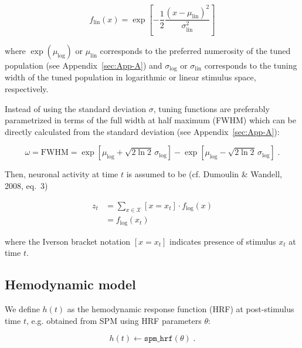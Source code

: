 \documentclass[a4paper,12pt]{article}
\begin{document}
\begin{equation} \label{eq:f-lin}
f_\mathrm{lin}(x) = \exp \left[ -\frac{1}{2} \frac{(x - \mu_\mathrm{lin})^2}{\sigma_\mathrm{lin}^2} \right]
\end{equation}

where $\exp(\mu_\mathrm{log})$ or $\mu_\mathrm{lin}$ corresponds to the preferred numerosity of the tuned population (see Appendix~\ref{sec:App-A}) and $\sigma_\mathrm{log}$ or $\sigma_\mathrm{lin}$ corresponds to the tuning width of the tuned population in logarithmic or linear stimulus space, respectively.

Instead of using the standard deviation $\sigma$, tuning functions are preferably parametrized in terms of the full width at half maximum (FWHM) which can be directly calculated from the standard deviation (see Appendix~\ref{sec:App-A}):

\begin{equation} \label{eq:fwhm-sigma}
\omega = \mathrm{FWHM} = \exp \left[ \mu_\mathrm{log} + \sqrt{2 \ln 2} \, \sigma_\mathrm{log} \right] - \exp \left[ \mu_\mathrm{log} - \sqrt{2 \ln 2} \, \sigma_\mathrm{log} \right] \; .
\end{equation}

Then, neuronal activity at time $t$ is assumed to be (cf. Dumoulin \& Wandell, 2008, eq.~3)

\vspace{-0.5em}
\begin{equation} \label{eq:z-t}
\begin{split}
z_t &= \sum_{x \in \mathcal{X}} \left[ x = x_t \right] \cdot f_\mathrm{log}(x) \\
&= f_\mathrm{log}(x_t)
\end{split}
\end{equation}

where the Iverson bracket notation $\left[ x = x_t \right]$ indicates presence of stimulus $x_t$ at time $t$.


\subsection{Hemodynamic model}

We define $h(t)$ as the hemodynamic response function (HRF) at post-stimulus time $t$, e.g. obtained from SPM using HRF parameters $\theta$:

\begin{equation} \label{eq:HRF}
h(t) \leftarrow \mathtt{spm\_hrf}(\theta) \; .
\end{equation}
\end{document}

